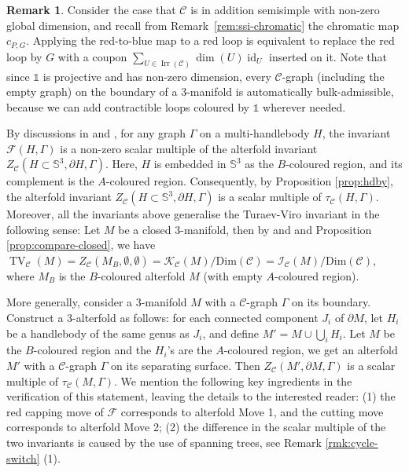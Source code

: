 \documentclass[11pt]{amsart}
\theoremstyle{definition}
\newtheorem{remark}[thm]{Remark}
\numberwithin{equation}{section}
\def\bd{{\partial}}
\def\cgpt{\mathscr{F}}
\def\cC{\mathcal{C}}
\def\cK{\mathcal{K}}
\def\bS{{\mathbb{S}}}
\def\1{{\mathds{1}}}
\def\irr{{\operatorname{Irr}}}
\def\id{{\operatorname{id}}}
\begin{document}
\begin{remark}\label{rmk:atfd-1}
Consider the case that $\cC$ is in addition semisimple with non-zero global dimension, and recall from Remark~\ref{rem:ssi-chromatic} the chromatic map $c_{P,G}$.
Applying the red-to-blue map to a red loop is equivalent to replace the red loop by $G$ with a coupon $\sum_{U\in\irr(\cC)} \dim(U) \id_U$ inserted on it. Note that since $\1$ is projective and has non-zero dimension, every $\cC$-graph (including the empty graph) on the boundary of a 3-manifold is automatically bulk-admissible, because we can add contractible loops coloured by $\1$ wherever needed. 

By discussions in \cite[Sec.\ 3.2]{atfd1} and \cite[Sec.\ 2]{CGPT20-Kup}, for any graph $\Gamma$ on a multi-handlebody $H$, the invariant $\cgpt(H, \Gamma)$ is a non-zero scalar multiple of the alterfold invariant $Z_{\cC}(H \subset \bS^3, \bd H, \Gamma)$. Here, $H$ is embedded in $\bS^3$ as the $B$-coloured region, and its complement is the $A$-coloured region. Consequently, by Proposition \ref{prop:hdby}, the alterfold invariant $Z_{\cC}(H \subset \bS^3, \bd H, \Gamma)$ is a scalar multiple of $\tau_{\cC}(H, \Gamma)$. 
Moreover, all the invariants above generalise the Turaev-Viro invariant in the following sense: Let $M$ be a closed 3-manifold, then by \cite[Thm.\ 2.7]{CGPT20-Kup} and \cite[Prop.\ 3.14]{atfd1} and Proposition \ref{prop:compare-closed}, we have 
$\operatorname{TV}_{\cC}(M) = Z_{\cC}(M_{B}, \emptyset, \emptyset) = \cK_{\cC}(M)/\mathrm{Dim}(\cC) = \mathscr{I}_{\cC}(M)/\mathrm{Dim}(\cC)$, 
where $M_B$ is the $B$-coloured alterfold $M$ (with empty $A$-coloured region).

More generally, consider a 3-manifold $M$ with a $\cC$-graph $\Gamma$ on its boundary. Construct a 3-alterfold as follows: for each connected component $J_i$ of $\bd M$, let $H_i$ be a handlebody of the same genus as $J_i$, and define $M' = M \cup \bigcup_i H_i$. Let $M$ be the $B$-coloured region and the $H_i$'s are the $A$-coloured region, we get an alterfold $M'$ with a $\cC$-graph $\Gamma$ on its separating surface. Then $Z_{\cC}(M', \bd M, \Gamma)$ is a scalar multiple of $\tau_{\cC}(M, \Gamma)$. We mention the following key ingredients in the verification of this statement, leaving the details to the interested reader: (1) the red capping move of $\cgpt$ corresponds to alterfold Move 1, and the cutting move corresponds to alterfold Move 2; (2) the difference in the scalar multiple of the two invariants is caused by the use of spanning trees, see Remark \ref{rmk:cycle-switch} (1).
\end{remark}
\end{document}
